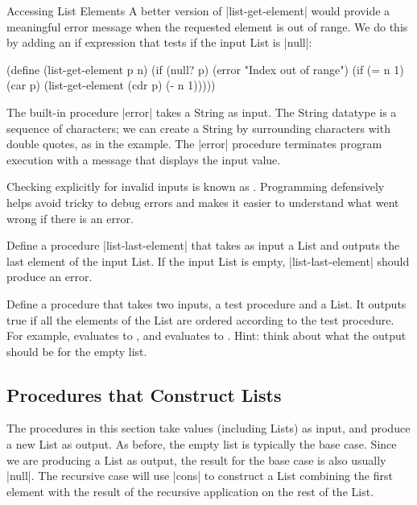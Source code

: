 \begin{schemeregion}
\begin{examplenobar}{Accessing List Elements}
A better version of \scheme|list-get-element| would provide a meaningful error message when the requested element is out of range.  We do this by adding an if expression that tests if the input List is \scheme|null|:
\begin{schemedisplay}
(define (list-get-element p n) 
   (if (null? p)
       (error "Index out of range")
       (if (= n 1) (car p) (list-get-element (cdr p) (- n 1)))))
\end{schemedisplay}
The built-in procedure \scheme|error| takes a String as input.  The String datatype is a sequence of characters; we can create a String by surrounding characters with double quotes, as in the example.  The \scheme|error| procedure terminates program execution with a message that displays the input value.

Checking explicitly for invalid inputs is known as .  Programming defensively helps avoid tricky to debug errors and makes it easier to understand what went wrong if there is an error.

\end{examplenobar}

\beforeex
\begin{exercise}
\bluestar Define a procedure \scheme|list-last-element| that takes as input a List and outputs the last element of the input List.  If the input List is empty, \scheme|list-last-element| should produce an error.
\solution{\LATER{}}
\end{exercise}
\afterex

\beforeex
\begin{exercise}
\greenstar
Define a procedure  that takes two inputs, a test procedure and a List.  It outputs true if all the elements of the List are ordered according to the test procedure.  For example,  evaluates to , and  evaluates to .  Hint: think about what the output should be for the empty list.
\solution{\LATER{}}
\end{exercise}
\afterex

\subsection{Procedures that Construct Lists}\label{sec:constructing-lists}

The procedures in this section take values (including Lists) as input, and produce a new List as output.  As before, the empty list is typically the base case.  Since we are producing a List as output, the result for the base case is also usually \schemeresult|null|.  The recursive case will use \scheme|cons| to construct a List combining the first element with the result of the recursive application on the rest of the List.


\end{schemeregion}

